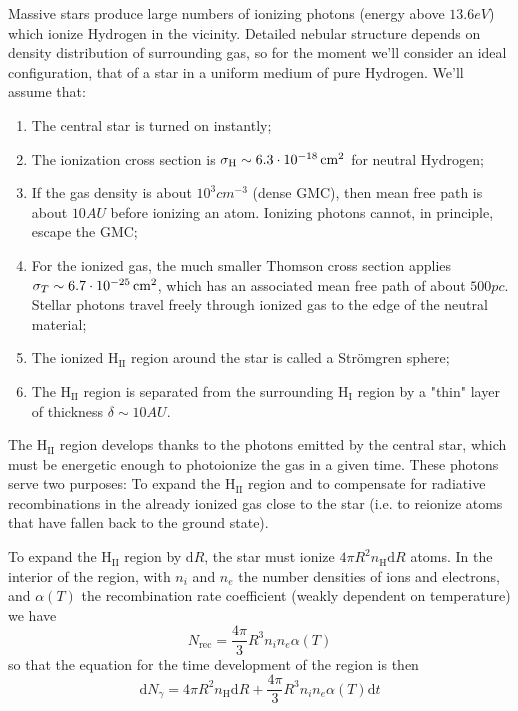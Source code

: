 Massive stars produce large numbers of ionizing photons (energy above $13.6\unit{eV}$) which ionize Hydrogen in the vicinity.
Detailed nebular structure depends on density distribution of surrounding gas, so for the moment we'll consider an ideal configuration, that of a star in a uniform medium of pure Hydrogen. We'll assume that:
\begin{enumerate}
    \item The central star is turned on instantly;
    \item The ionization cross section is $\sigma_{\text{H}}\sim 6.3\cdot 10^{-18}\,\text{cm}^{2}$ for neutral Hydrogen;
    \item If the gas density is about $10^{3}\unit{cm}^{-3}$ (dense GMC), then mean free path is about $10\unit{AU}$ before ionizing an atom. Ionizing photons cannot, in principle, escape the GMC;
    \item For the ionized gas, the much smaller Thomson cross section applies $\sigma_{T}\sim 6.7\cdot 10^{-25}\,\text{cm}^{2}$, which has an associated mean free path of about $500\unit{pc}$. Stellar photons travel freely through ionized gas to the edge of the neutral material;
    \item The ionized H$_{\text{II}}$ region around the star is called a Strömgren sphere;
    \item The H$_{\text{II}}$ region is separated from the surrounding H$_{\text{I}}$ region by a "thin" layer of thickness $\delta \sim 10\unit{AU}$.
\end{enumerate}
The H$_{\text{II}}$ region develops thanks to the photons emitted by the central star, which must be energetic enough to photoionize the gas in a given time. These photons serve two purposes: To expand the H$_{\text{II}}$ region and to compensate for radiative recombinations in the already ionized gas close to the star (i.e. to reionize atoms that have fallen back to the ground state).
\par To expand the H$_{\text{II}}$ region by $\text{d}R$, the star must ionize $4\pi R^{2}n_{\text{H}}\text{d}R$ atoms. In the interior of the region, with $n_{i}$ and $n_{e}$ the number densities of ions and electrons, and $\alpha(T)$ the recombination rate coefficient (weakly dependent on temperature) we have
\begin{equation*}
    N_{\text{rec}} = \frac{4\pi}{3}R^{3}n_{i}n_{e}\alpha(T)
\end{equation*}
so that the equation for the time development of the region is then
\begin{equation}
    \text{d}N_{\gamma} = 4\pi R^{2}n_{\text{H}}\text{d}R + \frac{4\pi}{3}R^{3}n_{i}n_{e}\alpha(T)\text{d}t
    \label{eq:photoionizationbalance}
\end{equation}
